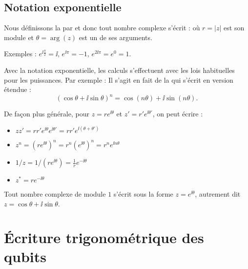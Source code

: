 \documentclass[11pt,class=report,crop=false]{standalone}
\begin{document}
\subsection{Notation exponentielle}

Nous définissons la  par
 et donc tout nombre complexe s'écrit :
o\`u $r = \left| z \right|$ est son module et $\theta = \arg (z)$ est un de ses arguments.


Exemples : $e^{\ii\frac\pi2} = \ii$, $e^{\ii\pi} = -1$, $e^{2\ii \pi} = e^0 = 1$.


\bigskip

Avec la notation exponentielle, les calculs s'effectuent avec les lois habituelles pour les puissances. 
Par exemple :
Il s'agit en fait de la  qui s'écrit en version étendue :
$$\left( \cos \theta + \ii \sin \theta \right)^n = \cos \left( n \theta \right)
  + \ii  \sin \left( n \theta \right).$$
  
De façon plus générale, pour $z = r e^{\ii  \theta}$
et $z' = r' e^{\ii  \theta'}$, on peut écrire :
\begin{itemize}
	\item $zz' = r r' e^{\ii  \theta} e^{\ii  \theta'} = r r' e^{\ii  (\theta + \theta')}$
	\item $z^n = \left( r e^{\ii  \theta} \right)^n = r^n  \left( e^{\ii  \theta}
	\right)^n = r^n e^{\ii n \theta}$
	\item $1 / z = 1 / \left( r e^{\ii  \theta} \right) = \frac{1}{r} e^{- \ii
		\theta}$
	\item $z^* = r e^{-\ii \theta}$	
\end{itemize}

   
   
Tout nombre complexe de module $1$ s'écrit sous la forme $z=e^{\ii\theta}$,
autrement dit $z = \cos\theta +\ii\sin\theta$.

\section{Écriture trigonométrique des qubits}
\end{document}
